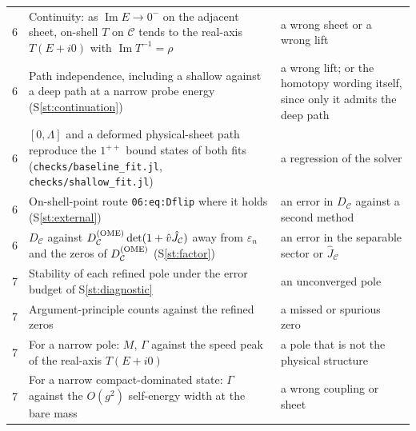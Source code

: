 \documentclass[11pt]{article}
\newcommand{\file}[1]{\nolinkurl{#1}}
\newcommand{\Sr}[1]{S\ref{#1}}
\begin{document}
\begin{xltabular}{\textwidth}{@{}lLL@{}}
6 & Continuity: as $\operatorname{Im}E\to0^-$ on the adjacent sheet, on-shell $T$ on $\mathcal C$ tends to the real-axis $T(E+i0)$ with $\operatorname{Im}T^{-1}=\rho$ & a wrong sheet or a wrong lift\\
6 & Path independence, including a shallow against a deep path at a narrow probe energy (\Sr{st:continuation}) & a wrong lift; or the homotopy wording itself, since only it admits the deep path\\
6 & $[0,\Lambda]$ and a deformed physical-sheet path reproduce the $1^{++}$ bound states of both fits (\file{checks/baseline_fit.jl}, \file{checks/shallow_fit.jl}) & a regression of the solver\\
6 & On-shell-point route \texttt{06:eq:Dflip} where it holds (\Sr{st:external}) & an error in $D_{\mathcal C}$ against a second method\\
6 & $D_{\mathcal C}$ against $D^{\rm(OME)}_{\mathcal C}\det(1+\hat v\hat J_{\mathcal C})$ away from $\varepsilon_n$ and the zeros of $D^{\rm(OME)}_{\mathcal C}$ (\Sr{st:factor}) & an error in the separable sector or $\hat J_{\mathcal C}$\\
7 & Stability of each refined pole under the error budget of \Sr{st:diagnostic} & an unconverged pole\\
7 & Argument-principle counts against the refined zeros & a missed or spurious zero\\
7 & For a narrow pole: $M$, $\Gamma$ against the speed peak of the real-axis $T(E+i0)$ & a pole that is not the physical structure\\
7 & For a narrow compact-dominated state: $\Gamma$ against the $O(g^2)$ self-energy width at the bare mass & a wrong coupling or sheet\\
\bottomrule
\end{xltabular}
\end{document}
